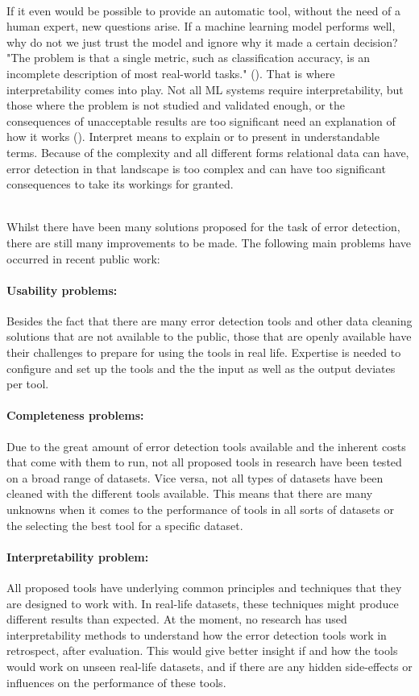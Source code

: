 ~\\If it even would be possible to provide an automatic tool, without the need of a human expert, new questions arise. 
If a machine learning model performs well, why do not we just trust the model and ignore why it made a certain decision? "The problem is that a single metric, such as classification accuracy, is an incomplete description of most real-world tasks." (\cite{Molnar2020-do}).
That is where interpretability comes into play. Not all ML systems require interpretability, but those where the problem is not studied and validated enough, or the consequences of unacceptable results are too significant need an explanation of how it works (\cite{Doshi-Velez2017-ec}). Interpret means to explain or to present in understandable terms. Because of the complexity and all different forms relational data can have, error detection in that landscape is too complex and can have too significant consequences to take its workings for granted. 

~\\Whilst there have been many solutions proposed for the task of error detection, there are still many improvements to be made. The following main problems have occurred in recent public work:

\paragraph{Usability problems:} Besides the fact that there are many error detection tools and other data cleaning solutions that are not available to the public, those that are openly available have their challenges to prepare for using the tools in real life. Expertise is needed to configure and set up the tools and the the input as well as the output deviates per tool. 

\paragraph{Completeness problems:} Due to the great amount of error detection tools available and the inherent costs that come with them to run, not all proposed tools in research have been tested on a broad range of datasets. Vice versa, not all types of datasets have been cleaned with the different tools available. This means that there are many unknowns when it comes to the performance of tools in all sorts of datasets or the selecting the best tool for a specific dataset.

\paragraph{Interpretability problem:} All proposed tools have underlying common principles and techniques that they are designed to work with. In real-life datasets, these techniques might produce different results than expected. At the moment, no research has used interpretability methods to understand how the error detection tools work in retrospect, after evaluation. This would give better insight if and how the tools would work on unseen real-life datasets, and if there are any hidden side-effects or influences on the performance of these tools.
